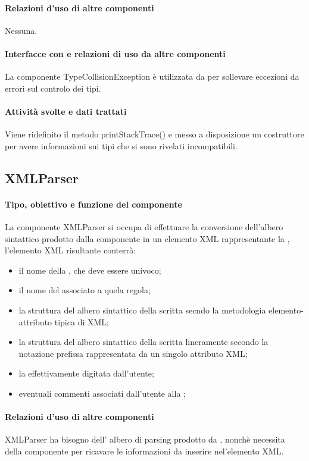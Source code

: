 \documentclass[11pt,titlepage,a4paper]{report}
\begin{document}
\paragraph{Relazioni d'uso di altre componenti}
Nessuna.
\paragraph{Interfacce con e relazioni di uso da altre componenti}
La componente TypeCollisionException \`e utilizzata da \brp per sollevare eccezioni da errori sul controlo dei tipi.
\paragraph{Attivit\`a svolte e dati trattati}
Viene ridefinito il metodo printStackTrace() e messo a disposizione un costruttore per avere informazioni sui tipi che si sono rivelati incompatibili.

\subsection{XMLParser}%
\paragraph{Tipo, obiettivo e funzione del componente}
La componente XMLParser si occupa di effettuare la conversione dell'albero sintattico prodotto dalla componente \brp in un elemento XML rappresentante la \br, l'elemento XML risultante conterr\`a:
\begin{itemize}
 \item il nome della \br, che deve essere univoco;
 \item il nome del \bo associato a quela regola;
 \item la struttura del albero sintattico della \br scritta secndo la metodologia elemento-attributo tipica di XML;
 \item la struttura del albero sintattico della \br scritta lineramente secondo la notazione prefissa rappresentata da un singolo attributo XML;
 \item la \br effettivamente digitata dall'utente;
 \item eventuali commenti associati dall'utente alla \br;
\end{itemize}
\paragraph{Relazioni d'uso di altre componenti}
XMLParser ha bisogno dell' albero di parsing prodotto da \brp, nonch\`e necessita della componente \br per ricavare le informazioni da inserire nel'elemento XML.
\end{document}
